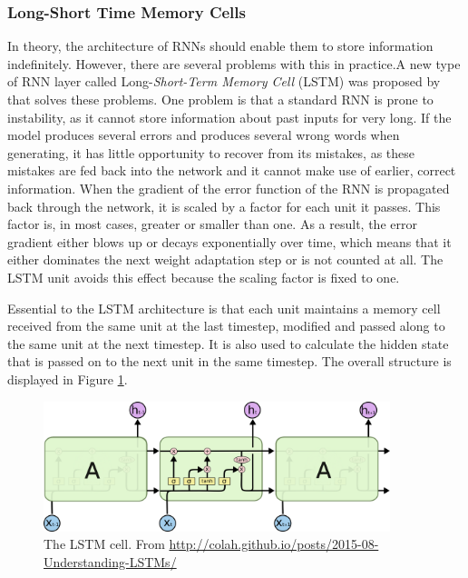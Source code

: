 \documentclass[11pt,a4paper,twoside,openright]{scrbook}
\begin{document}
\subsubsection{Long-Short Time Memory Cells}
In theory, the architecture of RNNs should enable them to store information indefinitely. However, there are several problems with this in practice.A new type of RNN layer called Long-\textit{Short-Term Memory Cell} (LSTM) was proposed by \cite{hochreiter-schmidhuber} that solves these problems.
One problem is that a standard RNN is prone to instability, as it cannot store information about past inputs for very long. If the model produces several errors and produces several wrong words when generating, it has little opportunity to recover from its mistakes, as these mistakes are fed back into the network and it cannot make use of earlier, correct information. When the gradient of the error function of the RNN is propagated back through the network, it is scaled by a factor for each unit it passes. This factor is, in most cases, greater or smaller than one. As a result, the error gradient either blows up or decays exponentially over time, which means that it either dominates the next weight adaptation step or is not counted at all. The LSTM unit avoids this effect because the scaling factor is fixed to one\cite{sundermeyer}. \cite{graves}

Essential to the LSTM architecture is that each unit maintains a memory cell received from the same unit at the last timestep, modified and passed along to the same unit at the next timestep. It is also used to calculate the hidden state that is passed on to the next unit in the same timestep. The overall structure is displayed in Figure \ref{Figure:LSTM}.

\begin{figure}
\centering
\includegraphics[width=0.9\textwidth]{images/LSTM.png}
\caption{The LSTM cell. \tiny{From \url{http://colah.github.io/posts/2015-08-Understanding-LSTMs/}}}
\label{Figure:LSTM}
\end{figure}
\end{document}
